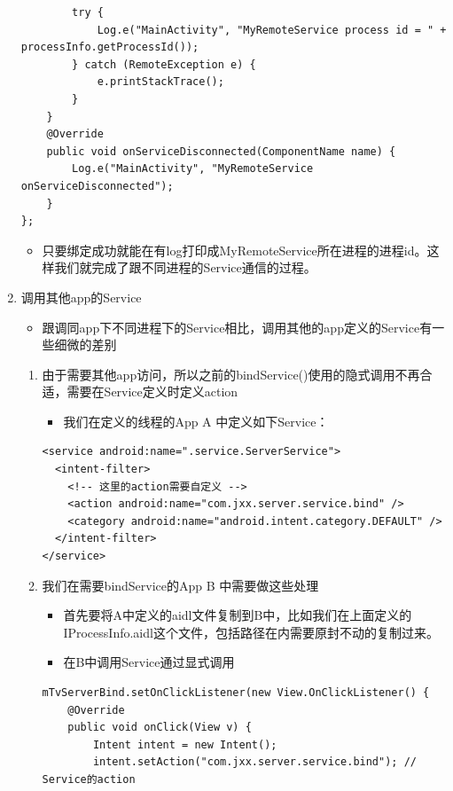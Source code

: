 \documentclass[9pt, b5paper]{article}
\begin{document}
\begin{enumerate}
\begin{verbatim}
        try {
            Log.e("MainActivity", "MyRemoteService process id = " + processInfo.getProcessId());
        } catch (RemoteException e) {
            e.printStackTrace();
        }
    }
    @Override
    public void onServiceDisconnected(ComponentName name) {
        Log.e("MainActivity", "MyRemoteService onServiceDisconnected");
    }
};
\end{verbatim}
\begin{itemize}
\item 只要绑定成功就能在有log打印成MyRemoteService所在进程的进程id。这样我们就完成了跟不同进程的Service通信的过程。
\end{itemize}
\item 调用其他app的Service
\label{sec-1-6-1-2}
\begin{itemize}
\item 跟调同app下不同进程下的Service相比，调用其他的app定义的Service有一些细微的差别
\end{itemize}
\begin{enumerate}
\item 由于需要其他app访问，所以之前的bindService()使用的隐式调用不再合适，需要在Service定义时定义action
\label{sec-1-6-1-2-1}
\begin{itemize}
\item 我们在定义的线程的App A 中定义如下Service：
\end{itemize}
\begin{verbatim}
<service android:name=".service.ServerService">
  <intent-filter>
	<!-- 这里的action需要自定义 -->
    <action android:name="com.jxx.server.service.bind" />
    <category android:name="android.intent.category.DEFAULT" />
  </intent-filter>
</service>
\end{verbatim}
\item 我们在需要bindService的App B 中需要做这些处理
\label{sec-1-6-1-2-2}
\begin{itemize}
\item 首先要将A中定义的aidl文件复制到B中，比如我们在上面定义的IProcessInfo.aidl这个文件，包括路径在内需要原封不动的复制过来。
\item 在B中调用Service通过显式调用
\end{itemize}
\begin{verbatim}
mTvServerBind.setOnClickListener(new View.OnClickListener() {
    @Override
    public void onClick(View v) {
        Intent intent = new Intent();
        intent.setAction("com.jxx.server.service.bind"); // Service的action

\end{verbatim}
\end{enumerate}
\end{enumerate}
\end{document}
